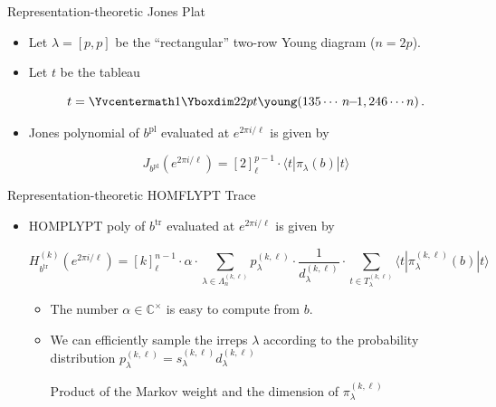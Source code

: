 \documentclass[slideColor]{prosper}
\renewcommand{\>}{\rangle}
\newcommand{\<}{\langle}
\newcommand{\C}{{\mathbb C}}
\begin{document}

\begin{slide}{Representation-theoretic Jones Plat}

\begin{itemize}
\item Let $\lambda=[p,p]$ be the ``rectangular'' two-row Young diagram ($n=2p$).

\newcommand{\nnn}{\mbox{\,\,\!$n\!\!-\!\!1$}}
\newcommand{\nnnn}{\mbox{$n$}}

\bigskip
\item Let $t$ be the tableau 

\[
t =
{\Yvcentermath1\Yboxdim22pt\young(135\cdots\nnn,246\cdots\nnnn)}\,.
\]

\medskip
\item Jones polynomial of $b^{\mathrm{pl}}$ evaluated at $e^{2\pi i/\ell}$ is given by

\[
J_{b^{\mathrm{pl}}}(e^{2\pi i/\ell}) = [2]_\ell^{p-1}\cdot\<t|\pi_\lambda(b)|t\>
\]

\end{itemize}
\end{slide}



\begin{slide}{Representation-theoretic HOMFLYPT Trace}

\begin{itemize}
\item HOMPLYPT poly of $b^\mathrm{tr}$ evaluated at $e^{2\pi i/\ell}$ is given by

\medskip
\[
H^{(k)}_{b^{\mathrm{tr}}}(e^{2\pi i/\ell}) =
[k]_\ell^{n-1} \cdot \alpha \cdot \sum_{\lambda\in\Lambda_n^{(k,\ell)}} p_\lambda^{(k,\ell)} \cdot \frac{1}{d_\lambda^{(k,\ell)}} \cdot 
\sum_{t\in T_\lambda^{(k,\ell)}} \<t|\pi_\lambda^{(k,\ell)}(b)|t\>
\]

\medskip
\begin{itemize}
\item The number $\alpha\in\C^\times$ is easy to compute from $b$.

\bigskip
\item We can efficiently sample the irreps $\lambda$ according to the probability distribution $p_\lambda^{(k,\ell)}=s_\lambda^{(k,\ell)} d_\lambda^{(k,\ell)}$ 

\medskip
Product of the Markov weight and the dimension of $\pi_\lambda^{(k,\ell)}$
\end{itemize}

\end{itemize}

\end{slide}
\end{document}
